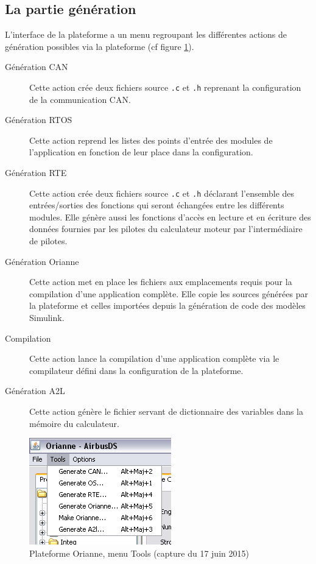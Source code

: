 \subsection{La partie génération}
L'interface de la plateforme a un menu regroupant les différentes actions de génération possibles via la plateforme (cf figure \ref{fig:toolsMenu}).
\begin{description}
  \item[Génération CAN] Cette action crée deux fichiers source {\tt.c} et {\tt .h} reprenant la configuration de la communication CAN.
  \item[Génération RTOS] Cette action reprend les listes des points d'entrée des modules de l'application en fonction de leur place dans la configuration.
  \item[Génération RTE] Cette action crée deux fichiers source {\tt.c} et {\tt .h} déclarant l'ensemble des entrées/sorties des fonctions qui seront échangées entre les différents modules. Elle génère aussi les fonctions d'accès en lecture et en écriture des données fournies par les pilotes du calculateur moteur par l'intermédiaire de pilotes.
  \item[Génération Orianne] Cette action met en place les fichiers aux emplacements requis pour la compilation d'une application complète. Elle copie les sources générées par la plateforme et celles importées depuis la génération de code des modèles Simulink\up{\circledR}.
  \item[Compilation] Cette action lance la compilation d'une application complète via le compilateur défini dans la configuration de la plateforme.
  \item[Génération A2L] Cette action génère le fichier  servant de dictionnaire des variables dans la mémoire du calculateur.
\end{description}

\begin{figure}[h]
  \centering
  \includegraphics[scale=0.7]{images/toolsMenu}
  \caption{Plateforme Orianne, menu Tools (capture du 17 juin 2015)}
  \label{fig:toolsMenu}
\end{figure}

